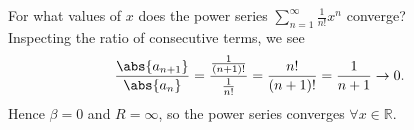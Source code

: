 \documentclass[../real_analysis.tex]{subfiles}
\begin{document}
        \begin{example}
            For what values of $x$ does the power series $\sum_{n=1}^\infty\frac{1}{n!}x^n$ converge?\\
            Inspecting the ratio of consecutive terms, we see
            \begin{equation}
                \frac{\abs{a_{n+1}}}{\abs{a_n}}=\frac{\frac{1}{(n+1)!}}{\frac{1}{n!}}=\frac{n!}{(n+1)!}=\frac{1}{n+1}\to0.
            \end{equation}
            Hence $\beta=0$ and $R=\infty$, so the power series converges $\forall x\in\mathbb{R}$.
        \end{example}
\end{document}
